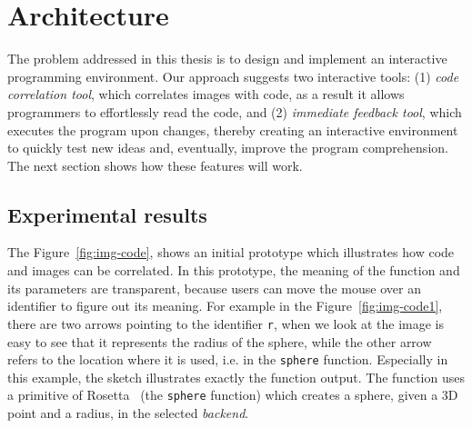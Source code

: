 
% 
% 

\section{Architecture}
\label{sec:arch}

The problem addressed in this thesis is to design and implement an interactive programming environment. Our approach suggests two interactive tools: (1) \textit{code correlation tool}, which correlates images with code, as a result it allows programmers to effortlessly read the code, and (2) \textit{immediate feedback tool}, which executes the program upon changes, thereby creating an interactive environment to quickly test new ideas and, eventually, improve the program comprehension. The next section shows how these features will work.

\subsection{Experimental results}

The Figure~\ref{fig:img-code}, shows an initial prototype which illustrates how code and images can be correlated. In this prototype, the meaning of the function and its parameters are transparent, because users can move the mouse over an identifier to figure out its meaning. For example in the Figure~\ref{fig:img-code1}, there are two arrows pointing to the identifier \texttt{r}, when we look at the image is easy to see that it represents the radius of the sphere, while the other arrow refers to the location where it is used, i.e. in the \texttt{sphere} function. Especially in this example, the sketch illustrates exactly the function output. The function uses a primitive of Rosetta~\cite{lopes2011portable} (the \texttt{sphere} function) which creates a sphere, given a 3D point and a radius, in the selected \textit{backend}.

